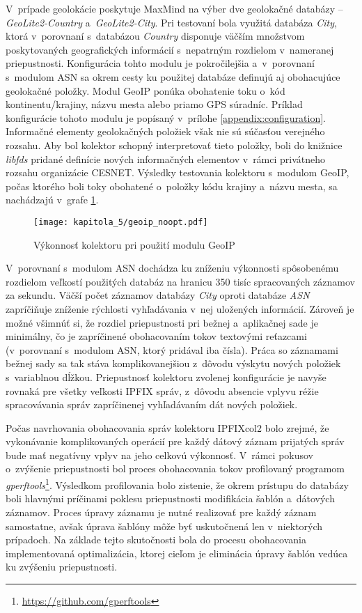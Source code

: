 V~prípade geolokácie poskytuje MaxMind na výber dve geolokačné databázy -- \textit{GeoLite2-Country} a~\textit{GeoLite2-City}. Pri testovaní bola využitá databáza \textit{City}, ktorá v~porovnaní s~databázou \textit{Country}
disponuje väčším množstvom poskytovaných geografických informácií s~nepatrným rozdielom v~nameranej priepustnosti. Konfigurácia tohto modulu je pokročilejšia a~v~porovnaní s~modulom ASN sa okrem cesty ku použitej databáze definujú aj obohacujúce
geolokačné položky. Modul GeoIP ponúka obohatenie toku o~kód kontinentu/krajiny, názvu mesta alebo priamo GPS súradníc. Príklad konfigurácie tohoto modulu je popísaný v~prílohe \ref{appendix:configuration}. Informačné elementy geolokačných položiek však
nie sú súčasťou verejného rozsahu. Aby bol kolektor schopný interpretovať tieto položky, boli do knižnice \textit{libfds} pridané definície nových informačných elementov v~rámci privátneho rozsahu organizácie CESNET.
Výsledky testovania kolektoru s~modulom GeoIP, počas ktorého boli toky obohatené o~položky kódu krajiny a~názvu mesta, sa nachádzajú v~grafe \ref{fig:tests_geoip_noopt}.

\begin{figure}[ht]
    \centering
    \texttt{[image: kapitola\_5/geoip\_noopt.pdf]}
    \caption{Výkonnosť kolektoru pri použití modulu GeoIP}
    \label{fig:tests_geoip_noopt}
\end{figure}

V~porovnaní s~modulom ASN dochádza ku zníženiu výkonnosti spôsobenému rozdielom veľkostí použitých databáz na hranicu 350 tisíc spracovaných záznamov za sekundu. Väčší počet záznamov databázy \textit{City} oproti databáze \textit{ASN}
zapríčiňuje zníženie rýchlosti vyhľadávania v~nej uložených informácií. Zároveň je možné všimnúť si, že rozdiel priepustnosti pri bežnej a~aplikačnej sade je minimálny, čo je zapríčinené obohacovaním tokov textovými reťazcami (v~porovnaní s~modulom ASN, ktorý pridával iba čísla).
Práca so záznamami bežnej sady sa tak stáva komplikovanejšiou z~dôvodu výskytu nových položiek s~variablnou dĺžkou. Priepustnosť kolektoru zvolenej konfigurácie je navyše
rovnaká pre všetky veľkosti IPFIX správ, z~dôvodu absencie vplyvu réžie spracovávania správ zapríčinenej vyhľadávaním dát nových položiek.

Počas navrhovania obohacovania správ kolektoru IPFIXcol2 bolo zrejmé, že vykonávanie komplikovaných operácií pre každý dátový záznam prijatých správ bude mať negatívny vplyv na jeho celkovú výkonnosť. V~rámci pokusov o~zvýšenie
priepustnosti bol proces obohacovania tokov profilovaný programom \textit{gperftools}\footnote{\url{https://github.com/gperftools}}. Výsledkom profilovania bolo zistenie, že okrem prístupu do databázy boli hlavnými príčinami
poklesu priepustnosti modifikácia šablón a~dátových záznamov. Proces úpravy záznamu je nutné realizovať pre každý záznam samostatne, avšak úprava šablóny môže byť uskutočnená len v~niektorých prípadoch. Na základe tejto
skutočnosti bola do procesu obohacovania implementovaná optimalizácia, ktorej cieľom je eliminácia úpravy šablón vedúca ku zvýšeniu priepustnosti.

